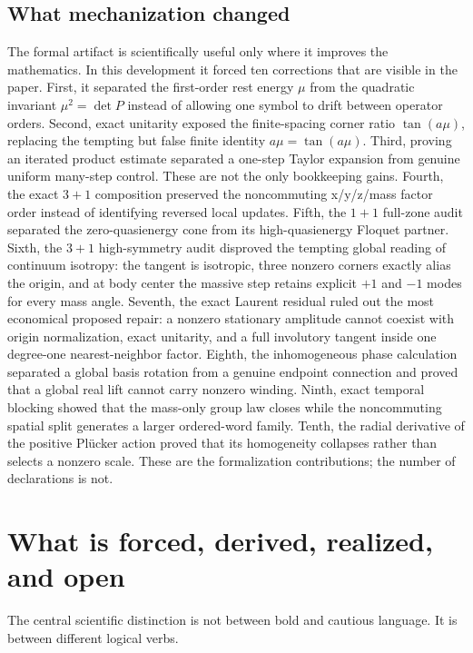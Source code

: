 \documentclass[11pt]{article}
\begin{document}
\subsection*{What mechanization changed}

The formal artifact is scientifically useful only where it improves the
mathematics.  In this development it forced ten corrections that are visible
in the paper.  First, it separated the first-order rest energy $\mu$ from the
quadratic invariant $\mu^2=\det P$ instead of allowing one symbol to drift
between operator orders.  Second, exact unitarity exposed the finite-spacing
corner ratio $\tan(a\mu)$, replacing the tempting but false finite identity
$a\mu=\tan(a\mu)$.  Third, proving an iterated product estimate separated a
one-step Taylor expansion from genuine uniform many-step control.  These are
not the only bookkeeping gains.  Fourth, the exact $3+1$ composition preserved
the noncommuting x/y/z/mass factor order instead of identifying reversed local
 updates.  Fifth, the $1+1$ full-zone audit separated the zero-quasienergy cone
 from its high-quasienergy Floquet partner.  Sixth, the $3+1$ high-symmetry audit
 disproved the tempting global reading of continuum isotropy: the tangent is
 isotropic, three nonzero corners exactly alias the origin, and at body center
 the massive step retains explicit $+1$ and $-1$ modes for every mass angle.
 Seventh, the exact Laurent residual ruled out the most economical proposed
 repair: a nonzero stationary amplitude cannot coexist with origin
 normalization, exact unitarity, and a full involutory tangent inside one
 degree-one nearest-neighbor factor.
 Eighth, the inhomogeneous phase calculation separated a global basis rotation
 from a genuine endpoint connection and proved that a global real lift cannot
 carry nonzero winding.  Ninth, exact temporal blocking showed that the
 mass-only group law closes while the noncommuting spatial split generates a
 larger ordered-word family.  Tenth, the radial derivative of the positive
 Pl\"ucker action proved that its homogeneity collapses rather than selects a
 nonzero scale.
 These are the formalization contributions; the number of declarations is not.

\section{What is forced, derived, realized, and open}

The central scientific distinction is not between bold and cautious language.
It is between different logical verbs.
\end{document}
